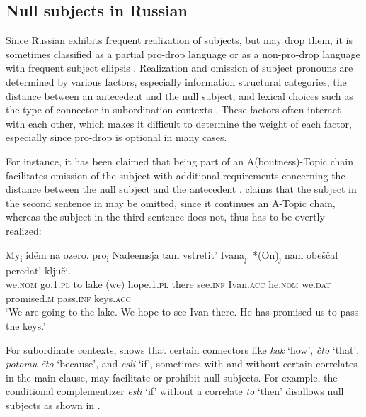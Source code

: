 \documentclass[output=paper,colorlinks,citecolor=brown]{langscibook}
\begin{document}
\subsection{Null subjects in Russian}
Since Russian exhibits frequent realization of subjects, but may drop them, it is sometimes classified as a partial pro-drop language or as a non-pro-drop language with frequent subject ellipsis \parencite{fehrmann2008subjects, Shushurin2018, Budennaya2019, Budennaya2020}. Realization and omission of subject pronouns are determined by various factors, especially information structural categories, the distance between an antecedent and the null subject, and lexical choices such as the type of connector in subordination contexts \parencite{FougeronBreillard2004, Bizzarri2015, madariaga2018diachronic, Madariaga2022, Pekelis2018, Budennaya2020}. These factors often interact with each other, which makes it difficult to determine the weight of each factor, especially since pro-drop is optional in many cases.

For instance, it has been claimed that being part of an A(boutness)-Topic chain facilitates omission of the subject with additional requirements concerning the distance between the null subject and the antecedent \parencite{madariaga2018diachronic, Madariaga2022}. \textcite{Madariaga2022} claims that the subject in the second sentence in  may be omitted, since it continues an A-Topic chain, whereas the subject in the third sentence does not, thus has to be overtly realized:

\ea \label{russianexamplelake}
\gll My\textsubscript{i} idëm na ozero. {pro\textsubscript{i}} Nadeemsja tam vstretit' Ivana\textsubscript{j}. *(On)\textsubscript{j} nam obeščal peredat’ ključi.\\ 
we.\textsc{nom} go.1.\textsc{pl} to lake (we) hope.1.\textsc{pl} there see.\textsc{inf} Ivan.\textsc{acc} he.\textsc{nom} we.\textsc{dat} promised.\textsc{m} pass.\textsc{inf} keys.\textsc{acc}\\
\glt `We are going to the lake. We hope to see Ivan there. He has promised us to pass the keys.'
\z
{}

For subordinate contexts, \textcite{Pekelis2018} shows that certain connectors like \textit{kak} `how', \textit{čto} `that', \textit{potomu čto} `because', and \textit{esli} `if', sometimes with and without certain correlates in the main clause, may facilitate or prohibit null subjects. For example, the conditional complementizer \textit{esli} `if' without a correlate \textit{to} `then' disallows null subjects as shown in  \parencite[155]{Shushurin2018}.  
\end{document}
